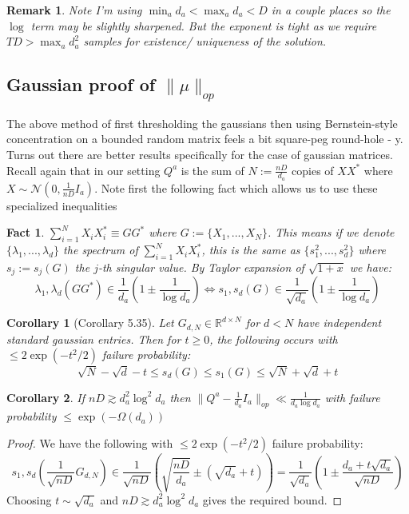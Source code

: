 \documentclass{article}
\newtheorem{corollary}{Corollary}
\newtheorem{fact}[theorem]{Fact}
\newtheorem{remark}{Remark}
\newcommand{\R}{{\mathbb{R}}}
\begin{document}
\begin{remark} Note I'm using $\min_{a} d_{a} < \max_{a} d_{a} < D$ in a couple places so the $\log$ term may be slightly sharpened. But the exponent is tight as we require $TD > \max_{a} d_{a}^{2}$ samples for existence/ uniqueness of the solution. 
\end{remark}


\subsection{Gaussian proof of $\|\mu\|_{op}$}
The above method of first thresholding the gaussians then using Bernstein-style concentration on a bounded random matrix feels a bit square-peg round-hole - y. Turns out there are better results specifically for the case of gaussian matrices. Recall again that in our setting $Q^{a}$ is the sum of $N := \frac{nD}{d_{a}}$ copies of $X X^{*}$ where $X \sim \mathcal{N}(0,\frac{1}{nD} I_{a})$. Note first the following fact which allows us to use these specialized inequalities

\begin{fact}
$\sum_{i=1}^{N} X_{i} X_{i}^{*} \equiv G G^{*} $ where $G := \{X_{1}, ..., X_{N}\}$. 
This means if we denote $\{\lambda_{1}, ..., \lambda_{d}\}$ the spectrum of $\sum_{i=1}^{N} X_{i} X_{i}^{*}$, this is the same as $\{s_{1}^{2}, ..., s_{d}^{2}\}$ where $s_{j} := s_{j}(G)$ the $j$-th singular value. By Taylor expansion of $\sqrt{1+x}$ we have:
\[ \lambda_{1},\lambda_{d}(GG^{*}) \in \frac{1}{d_{a}} \left( 1 \pm \frac{1}{\log d_{a}} \right) \iff s_{1},s_{d}(G) \in  \frac{1}{\sqrt{d_{a}}} \left( 1 \pm \frac{1}{\log d_{a}} \right)  \]
\end{fact}


\begin{corollary} [Corollary 5.35]\label{cor:vershynin}
Let $G_{d,N} \in \R^{d \times N}$ for $d < N$ have independent standard gaussian entries. Then for $t \geq 0$, the following occurs with $\leq 2 \exp(-t^{2}/2)$ failure probability:
\[ \sqrt{N} - \sqrt{d} - t \leq s_{d}(G) \leq s_{1}(G) \leq \sqrt{N} + \sqrt{d} + t  \]
\end{corollary}

\begin{corollary}
If $nD \gtrsim d_{a}^{2} \log^{2} d_{a}$ then $\|Q^{a} - \frac{1}{d_{a}} I_{a} \|_{op} \ll \frac{1}{d_{a} \log d_{a}}$ with failure probability $\leq \exp( - \Omega(d_{a}))$
\end{corollary}
\begin{proof}
We have the following with $\leq 2 \exp(-t^{2}/2)$ failure probability:
\[ s_{1},s_{d}\left( \frac{1}{\sqrt{nD}} G_{d,N} \right) \in \frac{1}{\sqrt{nD}} \left( \sqrt{\frac{nD}{d_{a}}} \pm (\sqrt{d_{a}} + t) \right) = \frac{1}{\sqrt{d_{a}}}\left( 1 \pm \frac{d_{a} + t \sqrt{d_{a}}}{\sqrt{nD}}  \right)  \]
Choosing $t \sim \sqrt{d_{a}}$ and $nD \gtrsim d_{a}^{2} \log^{2} d_{a}$ gives the required bound. 
\end{proof}
\end{document}
